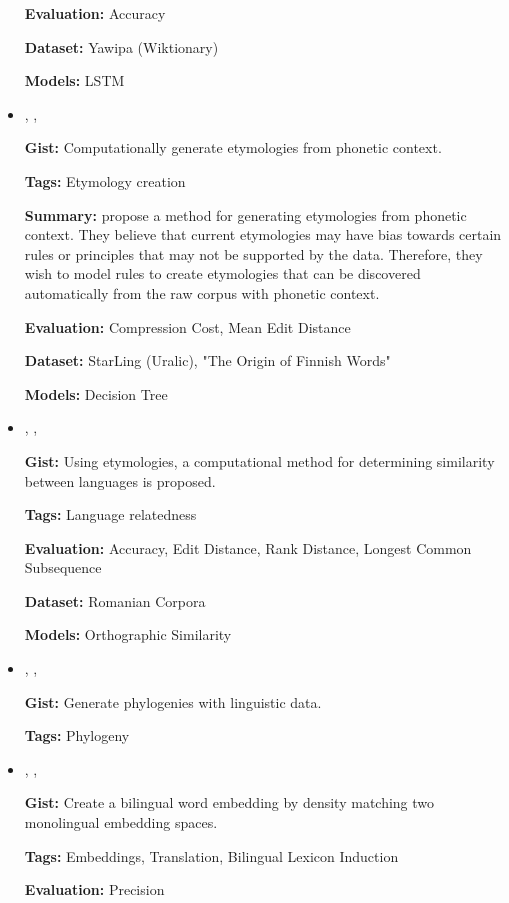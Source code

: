 \documentclass{article}[a4paper]
\newcommand{\bitem}[2]{
    \item[\cite{#1}]
        \textbf{\citetitle{#1}}, \citeauthor{#1}, \citeyear{#1}
        \newline\newline
        {#2}
}%
\begin{document}
\begin{itemize}
{        \textbf{Evaluation:}
        Accuracy

        \textbf{Dataset:}
        Yawipa (Wiktionary)

        \textbf{Models:}
        LSTM
    }%

    \bitem{wettig_using_2012}%
    {%
        \textbf{Gist:}
        Computationally generate etymologies from phonetic context.

        \textbf{Tags:}
        Etymology creation

        \textbf{Summary:}
        \citeauthor{wettig_using_2012} propose a method for generating
        etymologies from phonetic context. They believe that current etymologies
        may have bias towards certain rules or principles that may not be
        supported by the data. Therefore, they wish to model rules to create
        etymologies that can be discovered automatically from the raw corpus
        with phonetic context.

        \textbf{Evaluation:}
        Compression Cost, Mean Edit Distance

        \textbf{Dataset:}
        StarLing (Uralic), "The Origin of Finnish Words"

        \textbf{Models:}
        Decision Tree
    }%

    \bitem{ciobanu_etymological_2014}%
    {%
        \textbf{Gist:}
        Using etymologies, a computational method for determining similarity
        between languages is proposed.

        \textbf{Tags:}
        Language relatedness

        \textbf{Evaluation:}
        Accuracy, Edit Distance, Rank Distance, Longest Common Subsequence

        \textbf{Dataset:}
        Romanian Corpora

        \textbf{Models:}
        Orthographic Similarity
    }%

    \bitem{nouri_alignment_2016}%
    {%
        \textbf{Gist:}
        Generate phylogenies with linguistic data.

        \textbf{Tags:}
        Phylogeny
    }%

    \bitem{zhou_density_2019}%
    {%
        \textbf{Gist:}
        Create a bilingual word embedding by density matching two monolingual
        embedding spaces.

        \textbf{Tags:}
        Embeddings, Translation, Bilingual Lexicon Induction

        \textbf{Evaluation:}
        Precision

}
\end{itemize}
\end{document}
